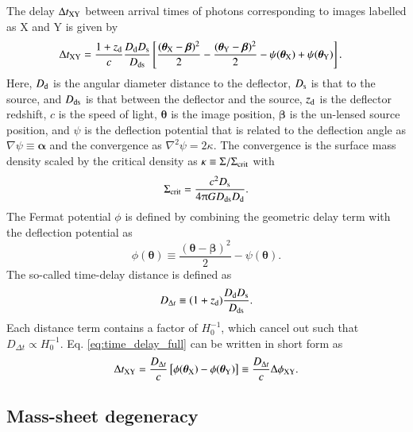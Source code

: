 \documentclass[longauth]{aa}
\newcommand{\Dd}{D_{\rm d}}
\newcommand{\Ds}{D_{\rm s}}
\newcommand{\Dds}{D_{\rm ds}}
\newcommand{\Ddt}{D_{\Delta t}}
\newcommand{\balpha}{\bm{\alpha}}
\newcommand{\bbeta}{\bm{\beta}}
\newcommand{\btheta}{\bm{\theta}}
\newcommand{\lreply}[1]{{{#1}}}
\begin{document}
The delay $\Delta t_{\rm XY}$ between arrival times of photons corresponding to images labelled as X and Y is given by
%
\begin{equation} \label{eq:time_delay_full}
        \begin{split}
        \Delta t_{\rm XY} &= \frac{1+z_{\rm d}}{c} \frac{\Dd \Ds }{\Dds} \left[ \frac{(\btheta_{\rm X} - \bbeta)^2}{2} - \frac{(\btheta_{\rm Y} - \bbeta)^2}{2} - \psi(\btheta_{\rm X}) + \psi(\btheta_{\rm Y})  \right].
        \end{split}
\end{equation}
%
Here, $\Dd$ is the angular diameter distance to the deflector, $\Ds$ is that to the source, and $\Dds$ is that between the deflector and the source, $z_{\rm d}$ is the deflector redshift, $c$ is the speed of light, $\btheta$ is the image position, $\bbeta$ is the un-lensed source position, and $\psi$ is the deflection potential that is related to the deflection angle as $\nabla \psi \equiv \balpha$ and the convergence as $\nabla^2 \psi = 2 \kappa$. The convergence is the surface mass density scaled by the critical density as $\kappa \equiv \Sigma/\Sigma_{\rm crit}$ with 
%
\begin{equation}
        \Sigma_{\rm crit} = \frac{c^2 \Ds}{4 \uppi G \Dds \Dd}.
\end{equation}
%
 The Fermat potential $\phi$ is defined by combining the geometric delay term with the deflection potential as
%
\begin{equation}
        \phi(\btheta) \equiv \frac{(\btheta - \bbeta)^2}{2} - \psi(\btheta).
\end{equation}
%
The so-called time-delay distance is defined as
%
\begin{equation}
        \Ddt \equiv (1+z_{\rm d}) \frac{\Dd \Ds }{\Dds}.
\end{equation}
%
Each distance term contains a factor of $H_{0}^{-1}$, which cancel out such that $\Ddt \propto H_{0}^{-1}$. \lreply{Eq.} \ref{eq:time_delay_full} can be written in short form as
%
\begin{equation}
\label{eq:time_delay_shortform}
        \Delta t_{\rm XY} = \frac{\Ddt}{c} \left[ \phi(\btheta_{\rm X})  - \phi(\btheta_{\rm Y}) \right] \equiv \frac{\Ddt}{c} \Delta \phi_{\rm XY} .
\end{equation}
%

\subsection{Mass-sheet degeneracy} \label{sec:mst}
\end{document}
